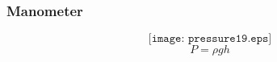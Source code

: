 \documentclass[aspectratio=169,xcolor=dvipsnames]{beamer}
\begin{document}
%
%
%
%
%
%
%
%
%
%
%
%
%
%
%
%
%
%
%
\begin{frame}
	\frametitle{Manometer}

	$$\texttt{[image: pressure19.eps]}$$
$$P = \rho g h$$
\end{frame}
\end{document}
